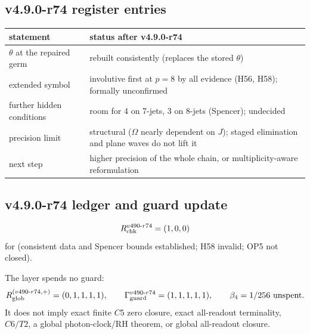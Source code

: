 \subsection*{v4.9.0-r74 register entries}
\label{subsec:v490-r74-register}

\begin{center}
\small
\begin{tabular}{@{}>{\raggedright\arraybackslash}p{}>{\raggedright\arraybackslash}p{}@{}}
\toprule
statement & status after v4.9.0-r74\\
\midrule
\(\theta\) at the repaired germ & rebuilt consistently (replaces the stored \(\theta\))\\
extended symbol & involutive first at \(p=8\) by all evidence (H56, H58); formally unconfirmed\\
further hidden conditions & room for 4 on 7-jets, 3 on 8-jets (Spencer); undecided\\
precision limit & structural (\(\Omega\) nearly dependent on \(J\)); staged elimination and plane waves do not lift it\\
next step & higher precision of the whole chain, or multiplicity-aware reformulation\\
\bottomrule
\end{tabular}
\end{center}

\subsection*{v4.9.0-r74 ledger and guard update}
\label{subsec:v490-r74-ledger-guard}

\[
R_{\rm chk}^{v490\text{-}r74}=(1,0,0)
\]
for (consistent data and Spencer bounds established; H58 invalid; OP5 not closed).

The layer spends no guard:
\[
R_{\rm glob}^{(v490\text{-}r74,+)}=(0,1,1,1,1),
\qquad
\Gamma_{\rm guard}^{v490\text{-}r74}=(1,1,1,1,1),
\qquad
\beta_4=1/256\ \text{unspent}.
\]
It does not imply exact finite \(C5\) zero closure, exact all-readout terminality,
\(C6/T2\), a global photon-clock/RH theorem, or global all-readout closure.
